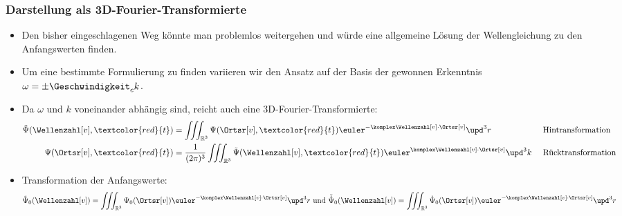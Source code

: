  \begin{frame}
  \frametitle{Darstellung als 3D-Fourier-Transformierte}
  \begin{itemize}[<+->]
  \item Den bisher eingeschlagenen Weg könnte man problemlos weitergehen und würde eine allgemeine Lösung der Wellengleichung zu den Anfangswerten finden.
  \item Um eine \alert{bestimmte Formulierung} zu finden variieren wir den Ansatz auf der Basis der gewonnen Erkenntnis \(\omega = \pm \Geschwindigkeit_c k\).
  \item Da \(\omega\) und \(k\) voneinander abhängig sind, reicht auch eine 3D-Fourier-Transformierte:
    \begin{align*}
      \tilde{\Psi}(\Wellenzahl[v], \textcolor{red}{t}) &= \iiint_{\mathbb{R}^3} \Psi (\Ortsr[v], \textcolor{red}{t}) \euler^{-\komplex \Wellenzahl[v]\cdot\Ortsr[v]} \upd^3 r &&\text{ Hintransformation}\\
      \Psi(\Ortsr[v], \textcolor{red}{t}) &= \frac{1}{(2\pi)^3}\iiint_{\mathbb{R}^3} \tilde{\Psi} (\Wellenzahl[v], \textcolor{red}{t}) \euler^{\komplex \Wellenzahl[v]\cdot\Ortsr[v]} \upd^3 k &&\text{ Rücktransformation}
    \end{align*}
  \item Transformation der Anfangswerte:
    \begin{equation*}
      \tilde{\Psi}_0(\Wellenzahl[v]) = \iiint_{\mathbb{R}^3} \Psi_0 (\Ortsr[v]) \euler^{-\komplex \Wellenzahl[v]\cdot\Ortsr[v]} \upd^3 r \text{ und }
\tilde{\dot{\Psi}}_0(\Wellenzahl[v]) = \iiint_{\mathbb{R}^3} \dot{\Psi}_0 (\Ortsr[v]) \euler^{-\komplex \Wellenzahl[v]\cdot\Ortsr[v]} \upd^3 r
    \end{equation*}
  \end{itemize}
  \end{frame}

